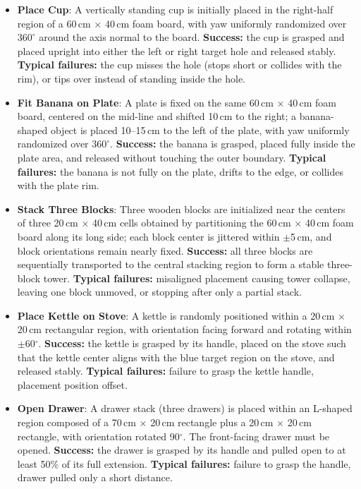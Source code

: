 \documentclass[runningheads]{llncs}
\begin{document}
\begin{itemize}

    \item \textbf{Place Cup}: A vertically standing cup is initially placed in the right-half region of a 60\,cm $\times$ 40\,cm foam board, with yaw uniformly randomized over $360^\circ$ around the axis normal to the board. \textbf{Success:} the cup is grasped and placed upright into either the left or right target hole and released stably. \textbf{Typical failures:} the cup misses the hole (stops short or collides with the rim), or tips over instead of standing inside the hole.
    
    \item \textbf{Fit Banana on Plate}: A plate is fixed on the same 60\,cm $\times$ 40\,cm foam board, centered on the mid-line and shifted 10\,cm to the right; a banana-shaped object is placed 10--15\,cm to the left of the plate, with yaw uniformly randomized over $360^\circ$. \textbf{Success:} the banana is grasped, placed fully inside the plate area, and released without touching the outer boundary. \textbf{Typical failures:} the banana is not fully on the plate, drifts to the edge, or collides with the plate rim.
    
    \item \textbf{Stack Three Blocks}: Three wooden blocks are initialized near the centers of three 20\,cm $\times$ 40\,cm cells obtained by partitioning the 60\,cm $\times$ 40\,cm foam board along its long side; each block center is jittered within $\pm$5\,cm, and block orientations remain nearly fixed. \textbf{Success:} all three blocks are sequentially transported to the central stacking region to form a stable three-block tower. \textbf{Typical failures:} misaligned placement causing tower collapse, leaving one block unmoved, or stopping after only a partial stack.

    \item \textbf{Place Kettle on Stove}: A kettle is randomly positioned within a 20\,cm $\times$ 20\,cm rectangular region, with orientation facing forward and rotating within $\pm$60$^\circ$. \textbf{Success:} the kettle is grasped by its handle, placed on the stove such that the kettle center aligns with the blue target region on the stove, and released stably. \textbf{Typical failures:} failure to grasp the kettle handle, placement position offset.
    
    \item \textbf{Open Drawer}: A drawer stack (three drawers) is placed within an L-shaped region composed of a 70\,cm $\times$ 20\,cm rectangle plus a 20\,cm $\times$ 20\,cm rectangle, with orientation rotated 90$^\circ$. The front-facing drawer must be opened. \textbf{Success:} the drawer is grasped by its handle and pulled open to at least 50\% of its full extension. \textbf{Typical failures:} failure to grasp the handle, drawer pulled only a short distance.
    

\end{itemize}
\end{document}
